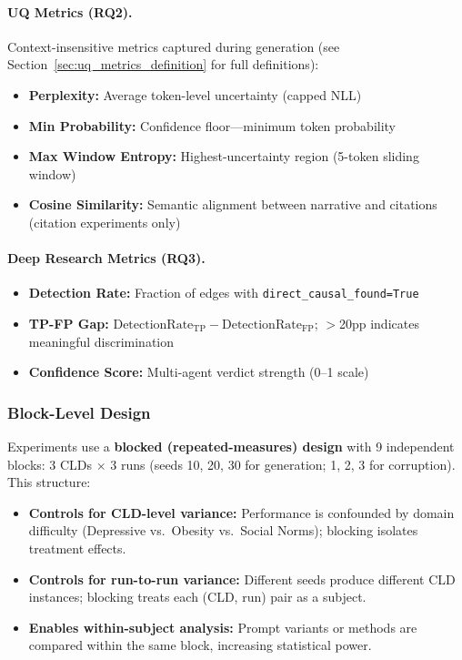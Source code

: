 \paragraph{UQ Metrics (RQ2).} Context-insensitive metrics captured during generation (see Section~\ref{sec:uq_metrics_definition} for full definitions):
\begin{itemize}[noitemsep]
    \item \textbf{Perplexity:} Average token-level uncertainty (capped NLL)
    \item \textbf{Min Probability:} Confidence floor---minimum token probability
    \item \textbf{Max Window Entropy:} Highest-uncertainty region (5-token sliding window)
    \item \textbf{Cosine Similarity:} Semantic alignment between narrative and citations (citation experiments only)
\end{itemize}

\paragraph{Deep Research Metrics (RQ3).}
\begin{itemize}[noitemsep]
    \item \textbf{Detection Rate:} Fraction of edges with \texttt{direct\_causal\_found=True}
    \item \textbf{TP-FP Gap:} $\text{DetectionRate}_{\text{TP}} - \text{DetectionRate}_{\text{FP}}$; $>$20pp indicates meaningful discrimination
    \item \textbf{Confidence Score:} Multi-agent verdict strength (0--1 scale)
\end{itemize}

\subsubsection{Block-Level Design}
\label{sec:block_design}

Experiments use a \textbf{blocked (repeated-measures) design} with 9 independent blocks: 3 CLDs $\times$ 3 runs (seeds 10, 20, 30 for generation; 1, 2, 3 for corruption). This structure:

\begin{itemize}[noitemsep]
    \item \textbf{Controls for CLD-level variance:} Performance is confounded by domain difficulty (Depressive vs.\ Obesity vs.\ Social Norms); blocking isolates treatment effects.
    \item \textbf{Controls for run-to-run variance:} Different seeds produce different CLD instances; blocking treats each (CLD, run) pair as a subject.
    \item \textbf{Enables within-subject analysis:} Prompt variants or methods are compared within the same block, increasing statistical power.
\end{itemize}

